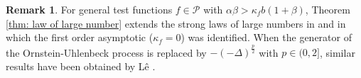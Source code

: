 \documentclass[12pt,a4paper]{amsart}
\theoremstyle{plain}
\theoremstyle{definition}
\newtheorem{rem}[thm]{Remark}
\numberwithin{equation}{section}
\begin{document}
\begin{rem} 
    For general test functions $f\in \mathcal{P}$ with $\alpha\beta>\kappa_fb(1+\beta)$, Theorem \ref{thm: law of large number} extends the strong laws of large numbers in  \cite{ChenRenYang2019Skeleton} and \cite{EckhoffKyprianouWinkel2015Spines} in which the first order asymptotic ($\kappa_f=0$) was identified.
    When the generator of the 
Ornstein-Uhlenbeck process is replaced by $-(-\Delta)^{\frac{p}{2}}$ with $p\in(0,2]$, similar results have been obtained by L\^{e} \cite{Le2019Long}.    
    \end{rem}
\end{document}
